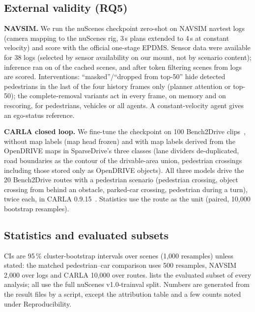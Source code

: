 \documentclass[journal]{IEEEtran}
\newcommand{\RQ}[1]{\textbf{RQ#1}}
\begin{document}
\subsection{External validity (\RQ5)}
\textbf{NAVSIM.} We run the nuScenes checkpoint zero-shot on NAVSIM navtest logs~\cite{dauner2024navsim} (camera mapping
to the nuScenes rig, 3\,s plans extended to 4\,s at constant velocity) and score with the official one-stage EPDMS.
Sensor data were available for 38 logs (selected by sensor availability on our mount, not by scenario content);
inference ran on \NavInferred{} of the \NavCached{} cached scenes, and after token filtering \NavN{} scenes from
\NavLogs{} logs are scored. Interventions: ``masked''/``dropped from top-50'' hide detected pedestrians in the last of the four history frames only (planner attention or top-50); the
complete-removal variants act in every frame, on memory and on rescoring, for pedestrians, vehicles or all agents. A
constant-velocity agent gives an ego-status reference.

\textbf{CARLA closed loop.} We fine-tune the checkpoint on 100 Bench2Drive clips~\cite{jia2024bench2drive}, without map
labels (map head frozen) and with map labels derived from the OpenDRIVE maps in SparseDrive's three classes (lane
dividers de-duplicated, road boundaries as the contour of the drivable-area union, pedestrian crossings including
those stored only as OpenDRIVE objects). All three models drive the 20 Bench2Drive routes with a pedestrian scenario
(pedestrian crossing, object crossing from behind an obstacle, parked-car crossing, pedestrian during a turn), twice
each, in CARLA 0.9.15~\cite{dosovitskiy2017carla}. Statistics use the route as the unit (paired, 10{,}000 bootstrap
resamples).

\subsection{Statistics and evaluated subsets}
CIs are 95\,\% cluster-bootstrap intervals over scenes (1{,}000 resamples) unless stated: the matched pedestrian--car
comparison uses 500 resamples, NAVSIM 2{,}000 over logs and CARLA 10{,}000 over routes.  lists the
evaluated subset of every analysis; all use the full nuScenes v1.0-trainval split. Numbers are generated from the result files by a script, except the
attribution table and a few counts noted under Reproducibility.
\end{document}
